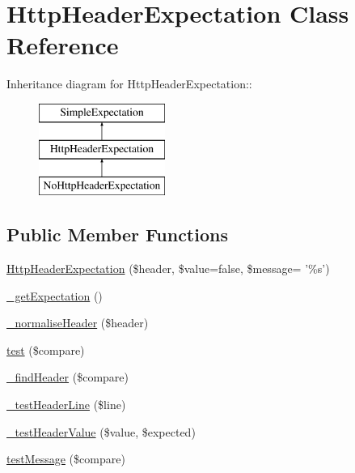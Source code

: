 \hypertarget{class_http_header_expectation}{
\section{HttpHeaderExpectation Class Reference}
\label{class_http_header_expectation}
}
Inheritance diagram for HttpHeaderExpectation::\begin{figure}[H]
\begin{center}
\leavevmode
\includegraphics[height=3cm]{class_http_header_expectation}
\end{center}
\end{figure}
\subsection*{Public Member Functions}
\begin{DoxyCompactItemize}
\item 
\hyperlink{class_http_header_expectation_aefc6e91171518d01a9b2dbc0a9885fcb}{HttpHeaderExpectation} (\$header, \$value=false, \$message= '\%s')
\item 
\hyperlink{class_http_header_expectation_ac77ecb228256b46964c46a7dfcbeb030}{\_\-getExpectation} ()
\item 
\hyperlink{class_http_header_expectation_a45f30ccc9cec011cd55f3bed48f45807}{\_\-normaliseHeader} (\$header)
\item 
\hyperlink{class_http_header_expectation_a22d6de67c863d5f596a90b64b4989637}{test} (\$compare)
\item 
\hyperlink{class_http_header_expectation_a8ddd193f67f36b80517dcd00c0c0a2c2}{\_\-findHeader} (\$compare)
\item 
\hyperlink{class_http_header_expectation_a088544f94d409d28df142ff0ca5dd146}{\_\-testHeaderLine} (\$line)
\item 
\hyperlink{class_http_header_expectation_a53fd1ae122651ea92db15820cf588329}{\_\-testHeaderValue} (\$value, \$expected)
\item 
\hyperlink{class_http_header_expectation_ac564586fb079247c33a04e6ead31f8cb}{testMessage} (\$compare)
\end{DoxyCompactItemize}
